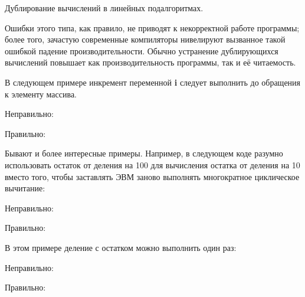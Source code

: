 \begin{typerror}
	Дублирование вычислений в линейных подалгоритмах.

	Ошибки этого типа, как правило, не приводят к некорректной работе программы;
	более того, зачастую современные компиляторы нивелируют вызванное такой ошибкой падение производительности.
	Обычно устранение дублирующихся вычислений повышает как производительность программы, так и её читаемость.

	В следующем примере инкремент переменной \textbf{i} следует выполнить до обращения к элементу массива.

	Неправильно:

	Правильно:

	Бывают и более интересные примеры.
	Например, в следующем коде разумно использовать остаток от деления на 100 для вычисления остатка от деления на 10 вместо того, чтобы заставлять ЭВМ заново выполнять многократное циклическое вычитание:

	Неправильно:

	Правильно:

	В этом примере деление с остатком можно выполнить один раз:

	Неправильно:

	Правильно:

	
\end{typerror}
